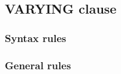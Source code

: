 \subsection{VARYING clause}
\begin{syntax}
   \identifier {}   
\end{syntax}

\subsubsection{Syntax rules}

\subsubsection{General rules}

